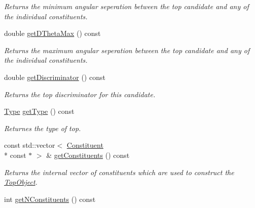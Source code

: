 \begin{DoxyCompactItemize}
\begin{DoxyCompactList}\small\item\em Returns the minimum angular seperation between the top candidate and any of the individual constituents. \end{DoxyCompactList}\item 
\hypertarget{classTopObject_afd9525b26ff81392af3773c5c88f2f68}{double \hyperlink{classTopObject_afd9525b26ff81392af3773c5c88f2f68}{get\-D\-Theta\-Max} () const }\label{classTopObject_afd9525b26ff81392af3773c5c88f2f68}

\begin{DoxyCompactList}\small\item\em Returns the maximum angular seperation between the top candidate and any of the individual constituents. \end{DoxyCompactList}\item 
\hypertarget{classTopObject_a144b61f5139eb1bef7bc00cee17deaf7}{double \hyperlink{classTopObject_a144b61f5139eb1bef7bc00cee17deaf7}{get\-Discriminator} () const }\label{classTopObject_a144b61f5139eb1bef7bc00cee17deaf7}

\begin{DoxyCompactList}\small\item\em Returns the top discriminator for this candidate. \end{DoxyCompactList}\item 
\hypertarget{classTopObject_a74f6fdda7a11b18b599c4a37294d26b9}{\hyperlink{classTopObject_af82a20e421c29bc667af7cd73fc46ba4}{Type} \hyperlink{classTopObject_a74f6fdda7a11b18b599c4a37294d26b9}{get\-Type} () const }\label{classTopObject_a74f6fdda7a11b18b599c4a37294d26b9}

\begin{DoxyCompactList}\small\item\em Returnes the type of top. \end{DoxyCompactList}\item 
\hypertarget{classTopObject_a3bd54d089da20318d1733c2d4e28493a}{const std\-::vector$<$ \hyperlink{classConstituent}{Constituent} \\*
const $\ast$ $>$ \& \hyperlink{classTopObject_a3bd54d089da20318d1733c2d4e28493a}{get\-Constituents} () const }\label{classTopObject_a3bd54d089da20318d1733c2d4e28493a}

\begin{DoxyCompactList}\small\item\em Returns the internal vector of constituents which are used to construct the \hyperlink{classTopObject}{Top\-Object}. \end{DoxyCompactList}\item 
\hypertarget{classTopObject_a562bafee171bf66c283d519c8021672d}{int \hyperlink{classTopObject_a562bafee171bf66c283d519c8021672d}{get\-N\-Constituents} () const }\label{classTopObject_a562bafee171bf66c283d519c8021672d}


\end{DoxyCompactItemize}
